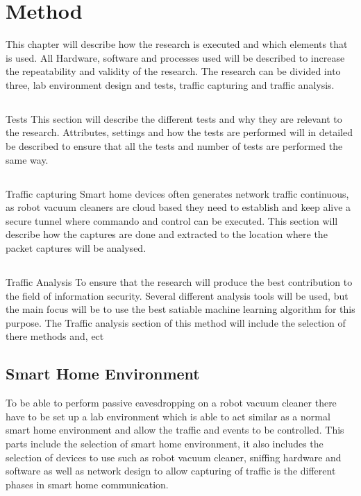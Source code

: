 \chapter*{Method}

This chapter will describe how the research is executed and which elements that is used. All Hardware, software and processes used will be described to increase the repeatability and validity of the research. The research can be divided into three, lab environment design and tests, traffic capturing and traffic analysis.

\section{}{Tests}
This section will describe the different tests and why they are relevant to the research. Attributes, settings and how the tests are performed will in detailed be described to ensure that all the tests and number of tests are performed the same way.

\section{}{Traffic capturing}
Smart home devices often generates network traffic continuous, as robot vacuum cleaners are cloud based they need to establish and keep alive a secure tunnel where commando and control can be executed. This section will describe how the captures are done and extracted to the location where the packet captures will be analysed. 

\section{}{Traffic Analysis}
To ensure that the research will produce the best contribution to the field of information security. Several different analysis tools will be used, but the main focus will be to use the best satiable machine learning algorithm for this purpose. The Traffic analysis section of this method will include the selection of there methods and, ect    

\section{Smart Home Environment}
To be able to perform passive eavesdropping on a robot vacuum cleaner there have to be set up a lab environment which is able to act similar as a normal smart home environment and allow the traffic and events to be controlled. This parts include the selection of smart home environment, it also includes the selection of devices to use such as robot vacuum cleaner, sniffing hardware and software as well as network design to allow capturing of traffic is the different phases in smart home communication. 

